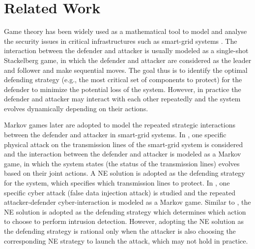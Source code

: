 \section{Related Work}
\label{relatedwork}
Game theory has been widely used as a mathematical tool to model and analyse the security issues in critical infrastructures such as smart-grid systems \cite{saad2012game,brown2006defending,salmeron2004analysis,pinar2010optimization}. The interaction between the defender and attacker is usually modeled as a single-shot Stackelberg game, in which the defender and attacker are considered as the leader and follower and make sequential moves. The goal thus is to identify the optimal defending strategy (e.g., the most critical set of components to protect) for the defender to minimize the potential loss of the system. However, in practice the defender and attacker may interact with each other repeatedly and the system evolves dynamically depending on their actions.

Markov games \cite{minmaxQ} later are adopted to model the repeated strategic interactions between the defender and attacker in smart-grid systems. In \cite{ma2013markov}, one specific physical attack on the transmission lines of the smart-grid system is considered and the interaction between the defender and attacker is modeled as a Markov game, in which the system states (the status of the transmission lines) evolves based on their joint actions. A NE solution is adopted as the defending strategy for the system, which specifies which transmission lines to protect. In \cite{law2012security}, one specific cyber attack (false data injection attack) is studied and the repeated attacker-defender cyber-interaction is modeled as a Markov game. Similar to \cite{ma2013markov}, the NE solution is adopted as the defending strategy which determines which action to choose to perform intrusion detection. However, adopting the NE solution as the defending strategy is rational only when the attacker is also choosing the corresponding NE strategy to launch the attack, which may not hold in practice.

